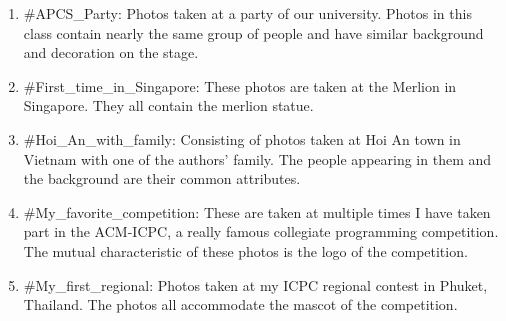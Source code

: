 \begin{enumerate}

\item \#APCS\_Party: Photos taken at a party of our university. Photos in this class contain nearly the same group of people and have similar background and decoration on the stage.
\item \#First\_time\_in\_Singapore: These photos are taken at the Merlion in Singapore. They all contain the merlion statue.
\item \#Hoi\_An\_with\_family: Consisting of photos taken at Hoi An town in Vietnam with one of the authors' family. The people appearing in them and the background are their common attributes.
\item \#My\_favorite\_competition: These are taken at multiple times I have taken part in the ACM-ICPC, a really famous collegiate programming competition. The mutual characteristic of these photos is the logo of the competition.
\item \#My\_first\_regional: Photos taken at my ICPC regional contest in Phuket, Thailand. The photos all accommodate the mascot of the competition.

\end{enumerate}

